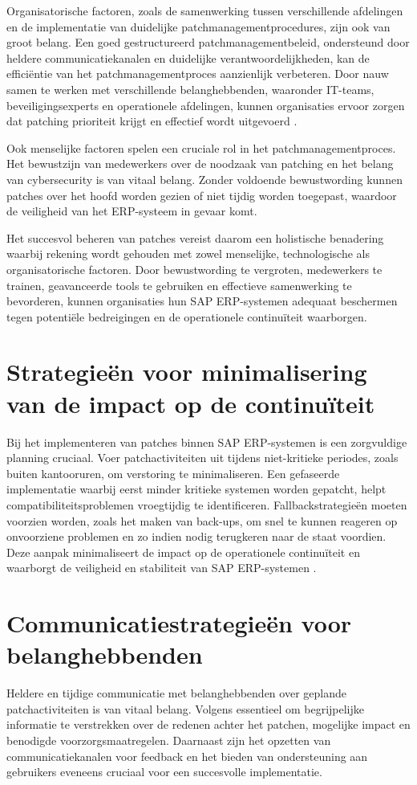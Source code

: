 Organisatorische factoren, zoals de samenwerking tussen verschillende afdelingen en de implementatie van duidelijke patchmanagementprocedures, zijn ook van groot belang. Een goed gestructureerd patchmanagementbeleid, ondersteund door heldere communicatiekanalen en 
duidelijke verantwoordelijkheden, kan de efficiëntie van het patchmanagementproces aanzienlijk verbeteren. Door nauw samen te werken met verschillende belanghebbenden, waaronder IT-teams, beveiligingsexperts en operationele afdelingen, kunnen organisaties ervoor 
zorgen dat patching prioriteit krijgt en effectief wordt uitgevoerd​ \autocite{Maditinos_2011}.

Ook menselijke factoren spelen een cruciale rol in het patchmanagementproces. Het bewustzijn van medewerkers over de noodzaak van patching en het belang van cybersecurity
is van vitaal belang. Zonder voldoende bewustwording kunnen patches over het hoofd worden gezien of niet tijdig worden toegepast, waardoor de veiligheid van het ERP-systeem in gevaar komt.

Het succesvol beheren van patches vereist daarom een holistische benadering waarbij rekening wordt gehouden met zowel menselijke, technologische als organisatorische factoren.
Door bewustwording te vergroten, medewerkers te trainen, geavanceerde tools te gebruiken en effectieve samenwerking te bevorderen, 
kunnen organisaties hun SAP ERP-systemen adequaat beschermen tegen potentiële bedreigingen en de operationele continuïteit waarborgen.

\section{Strategieën voor minimalisering van de impact op de continuïteit}
Bij het implementeren van patches binnen SAP ERP-systemen is een zorgvuldige planning cruciaal. Voer patchactiviteiten uit tijdens niet-kritieke periodes, zoals buiten kantooruren, om verstoring te minimaliseren. Een gefaseerde implementatie waarbij eerst minder kritieke systemen worden gepatcht, helpt
 compatibiliteitsproblemen vroegtijdig te identificeren. Fallbackstrategieën moeten voorzien worden, zoals het maken van back-ups, om snel te kunnen reageren op onvoorziene problemen en zo indien nodig terugkeren naar de staat voordien. Deze aanpak minimaliseert de impact op de operationele continuïteit en waarborgt de veiligheid en stabiliteit van SAP ERP-systemen \autocite{Shein2022}.

\section{Communicatiestrategieën voor belanghebbenden}
Heldere en tijdige communicatie met belanghebbenden over geplande patchactiviteiten is van vitaal belang. Volgens \textcite{Toren2019} essentieel om begrijpelijke informatie te verstrekken over de redenen achter het patchen,
mogelijke impact en benodigde voorzorgsmaatregelen. Daarnaast zijn het opzetten van communicatiekanalen voor feedback en het bieden van ondersteuning aan gebruikers eveneens cruciaal voor een succesvolle implementatie.


